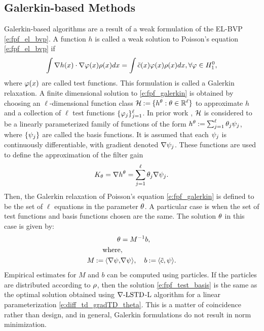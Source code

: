 \subsection{Galerkin-based Methods} %
\label{s:galerkin}
Galerkin-based algorithms are a result of a weak formulation of the EL-BVP \eqref{e:fpf_el_bvp}. A function $h$ is called a weak solution to Poisson's equation \eqref{e:fpf_el_bvp} if
\begin{equation}
\int \nabla h (x) \cdot \nabla \test(x)  \pr(x) dx = \int \tilc(x) \test(x) \pr(x) dx, \forall \test \in H^0_1,
\label{e:fpf_galerkin}
\end{equation}%
where $\varphi(x)$ are called test functions. This formulation is called a Galerkin relaxation. %
A finite dimensional solution to \eqref{e:fpf_galerkin} is obtained by choosing an $\ell$-dimensional  function class
${\cal H}  \mathbin{:=} \{h^\theta : \theta \in \mathbb{R}^\ell\}$ to approximate $h$ and a collection of $\ell$ test functions $\{\varphi_j\}_{j=1}^{\ell}$. In prior work \cite{yanmehmey13,yanlaumehmey16}, ${\cal H}$ is considered to be a linearly parameterized family of functions of the form $h^\theta \mathbin{:=} \sum_{j=1}^{\ell}\theta_{j}\psi_{j} $, where $\{\psi_j\}$ are called the basis functions.  It is assumed that each $\psi_j$ is continuously differentiable,  with gradient denoted   $\nabla \psi_{j} $.
 These   functions are used to define the approximation of the filter gain
\begin{equation}
K_\param = \nabla h^\param= \sum_{j=1}^{\ell}\param_{j}\gradbasis_{j}.
\label{e:fpf_basis_galerkin}
\end{equation}
Then, the Galerkin relaxation of Poisson's equation \eqref{e:fpf_galerkin} is defined to be the set of $\ell$ equations in the parameter $\theta$. A particular case is when the set of test functions and basis functions chosen are the same. The solution $\theta$ in this case is given by:
\begin{equation}
\begin{aligned}
\param & = M^{-1} b, \\
\text{where}&,\\ 
M \eqdef \langle \gradbasis, &\gradbasis \rangle, \quad b \eqdef \langle \tilc, \basis \rangle.
\label{e:fpf_test_basis}
\end{aligned}
\end{equation}
Empirical estimates for $M$ and $b$ can be computed using particles. If the particles are distributed according to $\rho$, then the solution \eqref{e:fpf_test_basis} is the same as the optimal solution obtained using $\nabla\text{-LSTD}$-L algorithm for a linear parameterization \eqref{e:diff_td_gradTD_theta}. This is a matter of coincidence rather than design, and in general, Galerkin formulations do not result in norm minimization. 

